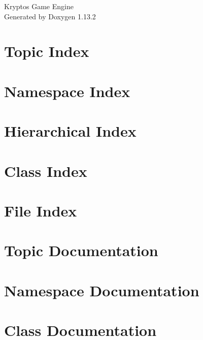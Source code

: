 \documentclass[twoside]{book}
\newcommand{\+}{\discretionary{\mbox{\scriptsize$\hookleftarrow$}}{}{}}
\newcommand{\clearemptydoublepage}{%
    \newpage{\pagestyle{empty}\cleardoublepage}%
  }
\begin{document}
  \raggedbottom
    \hypersetup{pageanchor=false,
                bookmarksnumbered=true,
                pdfencoding=unicode
               }
  \begin{titlepage}
  \vspace*{7cm}
  \begin{center}%
  {\Large Kryptos Game Engine}\\
  \vspace*{1cm}
  {\large Generated by Doxygen 1.13.2}\\
  \end{center}
  \end{titlepage}
  \clearemptydoublepage
  \tableofcontents
  \clearemptydoublepage
  \hypersetup{pageanchor=true}
\chapter{Topic Index}

\chapter{Namespace Index}

\chapter{Hierarchical Index}

\chapter{Class Index}

\chapter{File Index}

\chapter{Topic Documentation}

\chapter{Namespace Documentation}


\chapter{Class Documentation}









\end{document}
